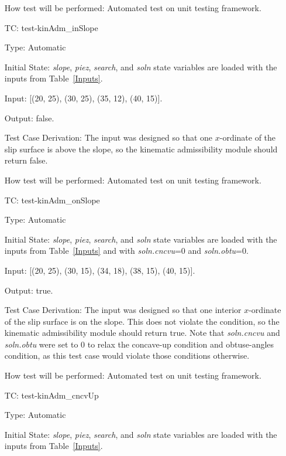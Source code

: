 \documentclass[12pt, titlepage]{article}
\newcounter{utestnum} %
\begin{document}
\begin{enumerate}[label=TC\arabic*:,ref={\arabic*}]
	How test will be performed: Automated test on unit testing framework.
	
	\item [TC\refstepcounter{utestnum}\theutestnum: \label{TC_KinAdmInSlope}] 
	test-kinAdm\_inSlope
	
	Type: Automatic
	
	Initial State: \textit{slope}, \textit{piez}, \textit{search}, and 
	\textit{soln} state variables are loaded with the inputs from 
	Table~\ref{Inputs}.
	
	Input: [(20, 25), (30, 25), (35, 12), (40, 15)].
	
	Output: false.
	
	Test Case Derivation: The input was designed so that one $x$-ordinate of 
	the slip surface is above the slope, so the kinematic admissibility module 
	should return false.
	
	How test will be performed: Automated test on unit testing framework.
	
	\item [TC\refstepcounter{utestnum}\theutestnum: \label{TC_KinAdmOnSlope}] 
	test-kinAdm\_onSlope
	
	Type: Automatic
	
	Initial State: \textit{slope}, \textit{piez}, \textit{search}, and 
	\textit{soln} state variables are loaded with the inputs from 
	Table~\ref{Inputs} and with \textit{soln.cncvu}=0 and \textit{soln.obtu}=0.
	
	Input: [(20, 25), (30, 15), (34, 18), (38, 15), (40, 15)].
	
	Output: true.
	
	Test Case Derivation: The input was designed so that one interior 
	$x$-ordinate of the slip surface is on the slope. This does not violate the 
	condition, so the kinematic admissibility module should return true. Note 
	that \textit{soln.cncvu} and \textit{soln.obtu} were set to 0 to relax the 
	concave-up condition and obtuse-angles condition, as this test case would 
	violate those conditions otherwise.
	
	How test will be performed: Automated test on unit testing framework.
	
	\item [TC\refstepcounter{utestnum}\theutestnum: \label{TC_KinAdmCncvUp}] 
	test-kinAdm\_cncvUp
	
	Type: Automatic
	
	Initial State: \textit{slope}, \textit{piez}, \textit{search}, and 
	\textit{soln} state variables are loaded with the inputs from 
	Table~\ref{Inputs}.
	

\end{enumerate}
\end{document}
